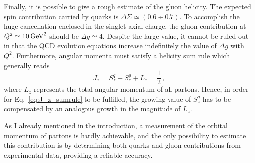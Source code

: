 Finally, it is possible to give a rough estimate of the gluon helicity. The expected spin contribution carried by quarks is $\Delta \Sigma \simeq (0.6  \div 0.7)$. To accomplish the huge cancellation enclosed in the singlet axial charge, the gluon contribution at $Q^2 \simeq 10 \, \textrm{GeV}^2$ should be $\Delta g \simeq 4$. Despite the large value, it cannot be ruled out in that the QCD evolution equations increase indefinitely the value of $\Delta g$ with $Q^2$. Furthermore, angular momenta must satisfy a helicity sum rule which generally reads
\begin{equation}
  J_{z} = S_{z}^{q} + S_{z}^{g} + L_z = \frac{1}{2} \,, 
  \label{eq:J_z_sumrule}
\end{equation} 
where $L_z$ represents the total angular momentum of all partons. Hence, in order for Eq.~\eqref{eq:J_z_sumrule} to be fulfilled, the growing value of $S_{z}^{g}$ has to be compensated by an analogous growth in the magnitude of $L_{z}$.%

As I already mentioned in the introduction, a measurement of the orbital momentum of partons is hardly achievable, and the only possibility to estimate this contribution is by determining both quarks and gluon contributions from experimental data, providing a reliable accuracy.

